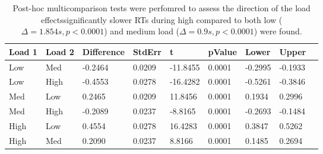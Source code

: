 \begin{table}
\centering
\begin{tabular}[0.2em]{@{}lllllllll@{}}\toprule
Load 1 & Load 2 & Difference & StdErr & t & pValue & Lower & Upper\\\toprule[0.2em]
Low & Med & -0.2464 & 0.0209 & -11.8455 & 0.0001 & -0.2995 & -0.1933 \\\midrule
Low & High & -0.4553 & 0.0278 & -16.4282 & 0.0001 & -0.5261 & -0.3846 \\\midrule
Med & Low & 0.2465 & 0.0209 & 11.8456 & 0.0001 & 0.1934 & 0.2996 \\\midrule
Med & High & -0.2089 & 0.0237 & -8.8165 & 0.0001 & -0.2693 & -0.1484 \\\midrule
High & Low & 0.4554 & 0.0278 & 16.4283 & 0.0001 & 0.3847 & 0.5262 \\\midrule
High & Med & 0.2090 & 0.0237 & 8.8166 & 0.0001 & 0.1485 & 0.2694 \\\bottomrule[0.2em]
\end{tabular}
\caption{Post-hoc multicomparison tests were perfomred to assess the direction of the load effectssignificantly slower RTs during high compared to both low ($\Delta=1.854s,p<0.0001$) and medium load ($\Delta=0.9s,p<0.0001$) were found.\label{tabel:behStudy1RTphLoad}}
\end{table}
